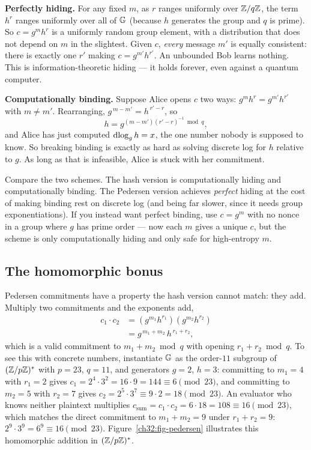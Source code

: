 \begin{whybox}
\textbf{Perfectly hiding.} For any fixed $m$, as $r$ ranges uniformly over $\mathbb{Z}/q\mathbb{Z}$, the term $h^r$ ranges uniformly over all of $\mathbb{G}$ (because $h$ generates the group and $q$ is prime). So $c = g^m h^r$ is a uniformly random group element, with a distribution that does not depend on $m$ in the slightest. Given $c$, \emph{every} message $m'$ is equally consistent: there is exactly one $r'$ making $c = g^{m'} h^{r'}$. An unbounded Bob learns nothing. This is information-theoretic hiding --- it holds forever, even against a quantum computer.

\textbf{Computationally binding.} Suppose Alice opens $c$ two ways: $g^{m}h^{r} = g^{m'}h^{r'}$ with $m \ne m'$. Rearranging, $g^{\,m-m'} = h^{\,r'-r}$, so
\[
  h = g^{(m-m')(r'-r)^{-1} \bmod q},
\]
and Alice has just computed $\operatorname{dlog}_g h = x$, the one number nobody is supposed to know. So breaking binding is exactly as hard as solving discrete log for $h$ relative to $g$. As long as that is infeasible, Alice is stuck with her commitment.
\end{whybox}

Compare the two schemes. The hash version is computationally hiding and computationally binding. The Pedersen version achieves \emph{perfect} hiding at the cost of making binding rest on discrete log (and being far slower, since it needs group exponentiations). If you instead want perfect binding, use $c = g^m$ with no nonce in a group where $g$ has prime order --- now each $m$ gives a unique $c$, but the scheme is only computationally hiding and only safe for high-entropy $m$.

\subsection{The homomorphic bonus}
\label{ch32:homomorphic}

Pedersen commitments have a property the hash version cannot match: they add. Multiply two commitments and the exponents add,
\begin{align*}
  c_1 \cdot c_2 &= (g^{m_1} h^{r_1})(g^{m_2} h^{r_2}) \\
                &= g^{\,m_1+m_2}\, h^{\,r_1+r_2},
\end{align*}
which is a valid commitment to $m_1 + m_2 \bmod q$ with opening $r_1 + r_2 \bmod q$. To see this with concrete numbers, instantiate $\mathbb{G}$ as the order-$11$ subgroup of $(\mathbb{Z}/p\mathbb{Z})^{*}$ with $p = 23$, $q = 11$, and generators $g = 2$, $h = 3$: committing to $m_1 = 4$ with $r_1 = 2$ gives $c_1 = 2^4 \cdot 3^2 = 16 \cdot 9 = 144 \equiv 6 \pmod{23}$, and committing to $m_2 = 5$ with $r_2 = 7$ gives $c_2 = 2^5 \cdot 3^7 \equiv 9 \cdot 2 = 18 \pmod{23}$. An evaluator who knows neither plaintext multiplies $c_{\text{sum}} = c_1 \cdot c_2 = 6 \cdot 18 = 108 \equiv 16 \pmod{23}$, which matches the direct commitment to $m_1 + m_2 = 9$ under $r_1 + r_2 = 9$: $2^9 \cdot 3^9 = 6^9 \equiv 16 \pmod{23}$. Figure~\ref{ch32:fig-pedersen} illustrates this homomorphic addition in $(\mathbb{Z}/p\mathbb{Z})^{*}$.

